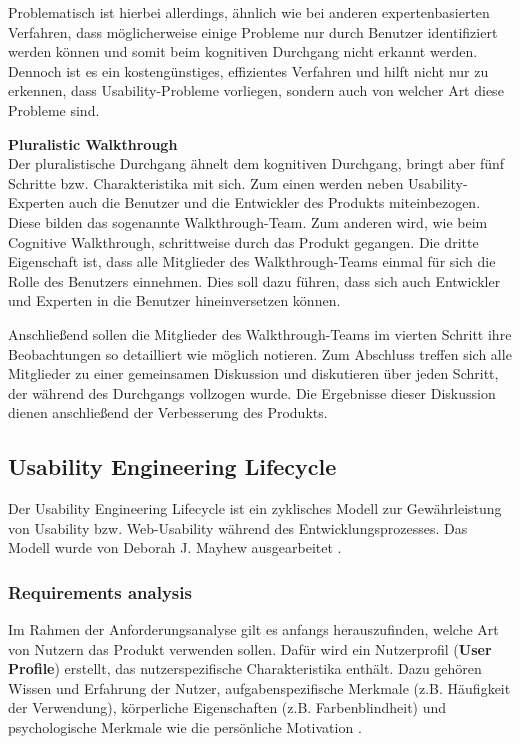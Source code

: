 \documentclass[utf8,biblatex]{lni}
\begin{document}
Problematisch ist hierbei allerdings, ähnlich wie bei anderen expertenbasierten Verfahren, dass möglicherweise einige Probleme nur durch Benutzer identifiziert werden können und somit beim kognitiven Durchgang nicht erkannt werden. Dennoch ist es ein kostengünstiges, effizientes Verfahren und hilft nicht nur zu erkennen, dass Usability-Probleme vorliegen, sondern auch von welcher Art diese Probleme sind. 

\textbf{Pluralistic Walkthrough}\\
Der pluralistische Durchgang ähnelt dem kognitiven Durchgang, bringt aber fünf Schritte bzw. Charakteristika mit sich. Zum einen werden neben Usability-Experten auch die Benutzer und die Entwickler des Produkts miteinbezogen. Diese bilden das sogenannte \glqq Walkthrough-Team\grqq{}. Zum anderen wird, wie beim Cognitive Walkthrough, schrittweise durch das Produkt gegangen. Die dritte Eigenschaft ist, dass alle Mitglieder des Walkthrough-Teams einmal für sich die Rolle des Benutzers einnehmen. Dies soll dazu führen, dass sich auch Entwickler und Experten in die Benutzer hineinversetzen können. 

Anschließend sollen die Mitglieder des Walkthrough-Teams im vierten Schritt ihre Beobachtungen so detailliert wie möglich notieren. Zum Abschluss treffen sich alle Mitglieder zu einer gemeinsamen Diskussion und diskutieren über jeden Schritt, der während des Durchgangs vollzogen wurde. Die Ergebnisse dieser Diskussion dienen anschließend der Verbesserung des Produkts.


\subsection{Usability Engineering Lifecycle} \label{chp:uel}
Der Usability Engineering Lifecycle ist ein zyklisches Modell zur Gewährleistung von Usability bzw. Web-Usability während des Entwicklungsprozesses. Das Modell wurde von Deborah J. Mayhew ausgearbeitet \cite{Mayhew.2010}.


\subsubsection{Requirements analysis}
Im Rahmen der Anforderungsanalyse gilt es anfangs herauszufinden, welche Art von Nutzern das Produkt verwenden sollen. Dafür wird ein Nutzerprofil (\textbf{User Profile}) erstellt, das nutzerspezifische Charakteristika enthält. Dazu gehören Wissen und Erfahrung der Nutzer, aufgabenspezifische Merkmale (z.B. Häufigkeit der Verwendung), körperliche Eigenschaften (z.B. Farbenblindheit) und psychologische Merkmale wie die persönliche Motivation \cite[36]{Mayhew.2010}.
\end{document}
